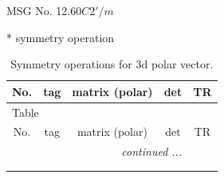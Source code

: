 \documentclass[fleqn,8pt]{jsarticle}
\begin{document}
\setcounter{MaxMatrixCols}{32}

\renewcommand{\tablename}{Table~}
\renewcommand{\figurename}{Figure~}
\begin{center}
\LARGE
MSG No. 12.60\quad$C2'/m$
\end{center}
* symmetry operation
\renewcommand{\arraystretch}{1.3}
\begin{longtable}{ccccc}
\caption{Symmetry operations for 3d polar vector.}
 \\
 \hline \hline
No. & tag & matrix (polar) & det & TR \\ \hline \endfirsthead

\multicolumn{4}{l}{\tablename\ \thetable{}} \\
 \hline \hline
No. & tag & matrix (polar) & det & TR \\ \hline \endhead

 \hline \hline
\multicolumn{4}{r}{\footnotesize\it continued ...} \\ \endfoot

 \hline \hline
\multicolumn{4}{r}{} \\ \endlastfoot


\end{longtable}
\end{document}
